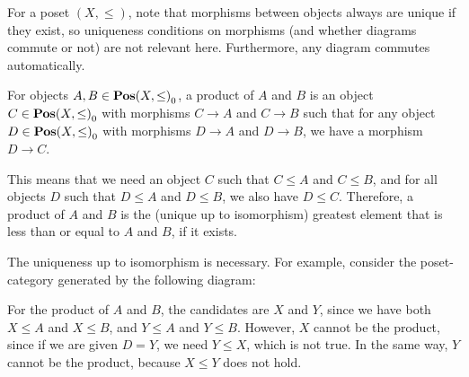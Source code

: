 \begin{solution}\label{sol:product_posetcat}
	For a poset $ (X, \leq) $, note that morphisms between objects always are unique if they exist, so uniqueness conditions on morphisms (and whether diagrams commute or not) are not relevant here.
	Furthermore, any diagram commutes automatically.
	
	For objects $ A, B \in {\mathbf{Pos}(X, \leq)}_0 $, a product of $ A $ and $ B $ is an object $ C \in {\mathbf{Pos}(X, \leq)}_0 $ with morphisms $ C \to A $ and $ C \to B $ such that for any object $ D \in {\mathbf{Pos}(X, \leq)}_0 $ with morphisms $ D \to A $ and $ D \to B $, we have a morphism $ D \to C $.

	This means that we need an object $ C $ such that $ C \leq A $ and $ C \leq B $, and for all objects $ D $ such that $ D \leq A $ and $ D \leq B $, we also have $ D \leq C $. Therefore, a product of $ A $ and $ B $ is the (unique up to isomorphism) greatest element that is less than or equal to $ A $ and $ B $, if it exists.

	\begin{rem}
		The uniqueness up to isomorphism is necessary. For example, consider the poset-category generated by the following diagram:
		\begin{center}
		\end{center}
		For the product of $ A $ and $ B $, the candidates are $ X $ and $ Y $, since we have both $ X \leq A $ and $ X \leq B $, and $ Y \leq A $ and $ Y \leq B $. However, $ X $ cannot be the product, since if we are given $ D = Y $, we need $ Y \leq X $, which is not true. In the same way, $ Y $ cannot be the product, because $ X \leq Y $ does not hold.
	\end{rem}
\end{solution}


